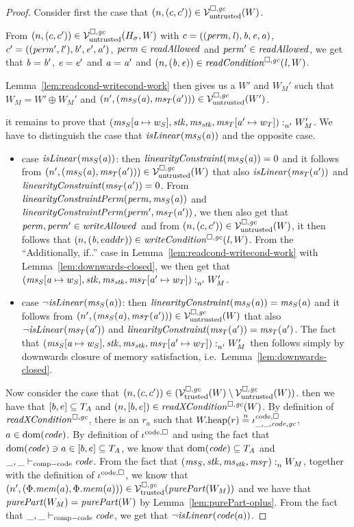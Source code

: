 \begin{proof}
  Consider first the case that $\npair{(c,c')}\in\lrv(W)$.

  From $\npair{(c,c')}\in\lrv(H_\sigma,W)$ with $c = ((\perm,\lin),\baddr,\eaddr,\aaddr)$, $c' = ((\perm',\lin'),\baddr',\eaddr',\aaddr')$, $\perm \in \readAllowed{}$ and $\perm' \in \readAllowed{}$, we get that $\baddr = \baddr'$, $\eaddr = \eaddr'$ and $\aaddr = \aaddr'$ and $\npair{(\baddr,\eaddr)} \in \readCond{\lin,W}$.

  Lemma~\ref{lem:readcond-writecond-work} then gives us a $W'$ and $W_M'$ such that $W_M = W' \oplus W_M'$ and $\npair[n']{(\ms_S(\aaddr),\ms_T(\aaddr'))} \in \lrv(W')$.

  it remains to prove that $\memSat[n']{(\ms_S\update{\aaddr}{w_S},\stk,\ms_\stk,\ms_T\update{\aaddr'}{w_T})}{W_M'}$.
  We have to distinguish the case that $\isLinear{\ms_S(\aaddr)}$ and the opposite case.
  \begin{itemize}
  \item case $\isLinear{\ms_S(\aaddr)}$: then $\linCons{\ms_S(\aaddr)} = 0$ and it follows from $\npair[n']{(\ms_S(\aaddr),\ms_T(\aaddr'))}\in\lrv(W)$ that also $\isLinear{\ms_T(\aaddr')}$ and $\linCons{\ms_T(\aaddr')} = 0$.
    From $\linConsPerm{\perm}{\ms_S(\aaddr)}$ and $\linConsPerm{\perm'}{\ms_T(\aaddr')}$, we then also get that $\perm,\perm' \in \writeAllowed{}$ and from $\npair{(c,c')}\in\lrv(W)$, it then follows that $\npair{(\baddr,eaddr)} \in \writeCond{\lin,W}$.
    From the ``Additionally, if..'' case in Lemma~\ref{lem:readcond-writecond-work} with Lemma~\ref{lem:downwards-closed}, we then get that $\memSat[n']{(\ms_S\update{\aaddr}{w_S},\stk,\ms_\stk,\ms_T\update{\aaddr'}{w_T})}{W_M'}$.

  \item case $\neg\isLinear{\ms_S(\aaddr)}$: then $\linCons{\ms_S(\aaddr)} = \ms_S(\aaddr)$ and it follows from $\npair[n']{(\ms_S(\aaddr),\ms_T(\aaddr'))}\in\lrv(W)$ that also $\neg\isLinear{\ms_T(\aaddr')}$ 
    and $\linCons{\ms_T(\aaddr')} = \ms_T(\aaddr')$.
    The fact that $\memSat[n']{(\ms_S\update{\aaddr}{w_S},\stk,\ms_\stk,\ms_T\update{\aaddr'}{w_T})}{W_M'}$ then follows simply by downwards closure of memory satisfaction, i.e.~Lemma~\ref{lem:downwards-closed}.
  \end{itemize}

  Now consider the case that $\npair{(c,c')}\in(\lrvg{\trusted}(W) \setminus \lrv(W))$. then we have that $[b,e] \subseteq \ta$ and $\npair{[b,e]} \in \xReadCond{W}$.
  By definition of $\xReadCond{}$, there is an $r_a$ such that $\pwheap(r) \nequal \codereg{\_,\_,\code,\gc}$, $a \in \dom(\code)$.
  By definition of $\codereg{}$ and using the fact that $\dom(\code) \ni a \in [b,e] \subseteq \ta$, we know that $\dom(\code) \subseteq \ta$ and $\_,\_\vdash_{\mathrm{comp-code}} \code$.
  From the fact that $\memSat{(\ms_S,\stk,\ms_\stk,\ms_T)}{W_M}$, together with the definition of $\codereg{}$, we know that $\npair[n']{(\Phi.\mem(a),\Phi.\mem(a))} \in \lrvg{\trusted}(\purePart{W_M})$ and we have that $\purePart{W_M} = \purePart{W}$ by Lemma~\ref{lem:purePart-oplus}. 
  From the fact that $\_,\_\vdash_{\mathrm{comp-code}} \code$, we get that $\neg \isLinear{\code(a)}$.
  

\end{proof}

